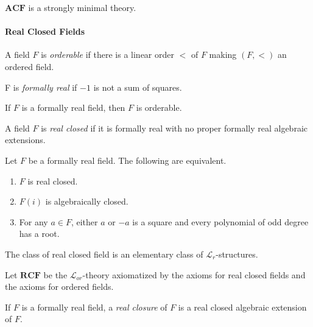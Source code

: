 \documentclass[
	fontsize=10pt, %
]{kaohandt}
\begin{document}
\begin{corollary}
    $\mathbf{ACF}$ is a strongly minimal theory.
\end{corollary}

\paragraph{\bfseries Real Closed Fields}

\begin{definition}
    A field $F$ is \emph{orderable} if there is a linear order $<$ of $F$ making $(F,<)$ an ordered field.

    F is \emph{formally real} if $-1$ is not a sum of squares.
\end{definition}

\begin{theorem}
    If $F$ is a formally real field, then $F$ is orderable.
\end{theorem}

\begin{definition}
    A field $F$ is \emph{real closed} if it is formally real with no proper formally real algebraic extensions.
\end{definition}

\begin{theorem}
    Let $F$ be a formally real field. The following are equivalent.
    \begin{enumerate}[label = {\roman*)}]
        \item $F$ is real closed.
        \item $F(i)$ is algebraically closed.
        \item For any $a\in F$, either $a$ or $-a$ is a square and every polynomial of odd degree has a root.
    \end{enumerate}
\end{theorem}

\begin{corollary}
    The class of real closed field is an elementary class of 
    $\mathcal{L}_r$-structures.
\end{corollary}

\begin{definition}
    Let $\mathbf{RCF}$ be the $\mathcal{L}_{or}$-theory axiomatized by the axioms for real closed fields and the axioms for ordered fields.

    If $F$ is a formally real field, a \emph{real closure} of $F$ is a real closed algebraic extension of $F$.
\end{definition}
\end{document}
